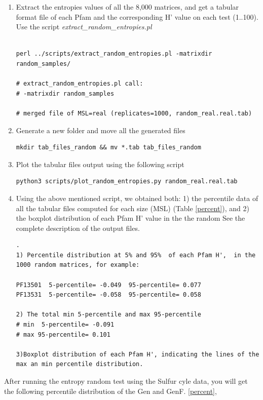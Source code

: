 \documentclass[12pt]{report}
\begin{document}
\begin{enumerate}
\begin{enumerate}
\begin{enumerate}
\begin{verbatim}
\end{verbatim}
\item Extract the entropies values of all the 8,000 matrices, and get a tabular format file of each Pfam and the corresponding  H' value on each test (1..100). Use the script \textit{extract\_random\_entropies.pl}
\begin{verbatim}

perl ../scripts/extract_random_entropies.pl -matrixdir 
random_samples/

# extract_random_entropies.pl call:
# -matrixdir random_samples

# merged file of MSL=real (replicates=1000, random_real.real.tab)
\end{verbatim}
\item Generate a new folder and move all the generated files 
\begin{verbatim}
mkdir tab_files_random && mv *.tab tab_files_random  
\end{verbatim}
\item Plot the tabular files output using the following script
\begin{verbatim}
python3 scripts/plot_random_entropies.py random_real.real.tab 
\end{verbatim}
\item Using the above mentioned script, we obtained both: 1) the percentile data of
all the tabular files computed for each size (MSL) (Table \ref{percent}), and
2) the boxplot distribution of each  Pfam H' value in the the random
See the complete description of the output files.
\begin{verbatim}.
1) Percentile distribution at 5% and 95%  of each Pfam H',  in the 
1000 random matrices, for example:

PF13501  5-percentile= -0.049  95-percentile= 0.077
PF13531  5-percentile= -0.058  95-percentile= 0.058

2) The total min 5-percentile and max 95-percentile 
# min  5-percentile= -0.091
# max 95-percentile= 0.101

3)Boxplot distribution of each Pfam H', indicating the lines of the 
max an min percentile distribution. 
\end{verbatim}
\end{enumerate}
After running the entropy random test using the Sulfur cyle data, you will get the following percentile distribution of the Gen and GenF.  \ref{percent}, 


\end{enumerate}
\end{enumerate}
\end{document}
